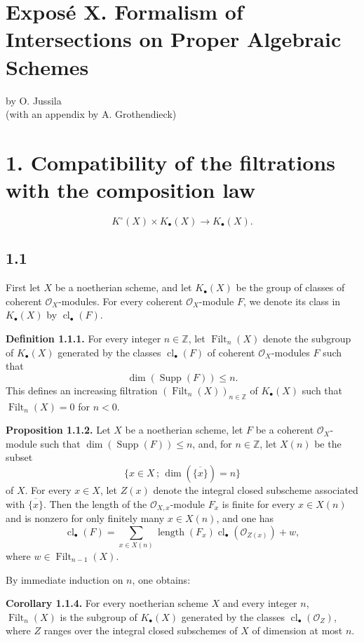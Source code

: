 \documentclass[11pt]{article}
\providecommand{\Filt}{\operatorname{Filt}}
\providecommand{\Supp}{\operatorname{Supp}}
\providecommand{\longg}{\operatorname{length}}
\providecommand{\cl}{\operatorname{cl}}
\begin{document}
\section*{Expos\'e X. Formalism of Intersections on Proper Algebraic Schemes}
\begin{center}
by O. Jussila\\
(with an appendix by A. Grothendieck)
\end{center}

\section*{1. Compatibility of the filtrations with the composition law}
\[
K^\circ(X)\times K_\bullet(X)\longrightarrow K_\bullet(X).
\]

\subsection*{1.1}
First let $X$ be a noetherian scheme, and let $K_\bullet(X)$ be the group of
classes of coherent $\mathcal O_X$-modules. For every coherent
$\mathcal O_X$-module $F$, we denote its class in $K_\bullet(X)$ by
$\cl_\bullet(F)$.

\textbf{Definition 1.1.1.}
For every integer $n\in\mathbb Z$, let $\Filt_n(X)$ denote the subgroup of
$K_\bullet(X)$ generated by the classes $\cl_\bullet(F)$ of coherent
$\mathcal O_X$-modules $F$ such that
\[
\dim(\Supp(F))\leq n.
\]
This defines an increasing filtration $(\Filt_n(X))_{n\in\mathbb Z}$ of
$K_\bullet(X)$ such that $\Filt_n(X)=0$ for $n<0$.

\textbf{Proposition 1.1.2.}
Let $X$ be a noetherian scheme, let $F$ be a coherent $\mathcal O_X$-module
such that $\dim(\Supp(F))\leq n$, and, for $n\in\mathbb Z$, let $X(n)$ be the
subset
\[
\{x\in X\,;\,\dim(\overline{\{x\}})=n\}
\]
of $X$. For every $x\in X$, let $Z(x)$ denote the integral closed subscheme
associated with $\overline{\{x\}}$. Then the length of the
$\mathcal O_{X,x}$-module $F_x$ is finite for every $x\in X(n)$ and is
nonzero for only finitely many $x\in X(n)$, and one has
\begin{equation}\tag{1.1.3}
\cl_\bullet(F)=
\sum_{x\in X(n)}\longg(F_x)\cl_\bullet(\mathcal O_{Z(x)})+w,
\end{equation}
where $w\in\Filt_{n-1}(X)$.

By immediate induction on $n$, one obtains:

\textbf{Corollary 1.1.4.}
For every noetherian scheme $X$ and every integer $n$, $\Filt_n(X)$ is the
subgroup of $K_\bullet(X)$ generated by the classes
$\cl_\bullet(\mathcal O_Z)$, where $Z$ ranges over the integral closed
subschemes of $X$ of dimension at most $n$.
\end{document}
